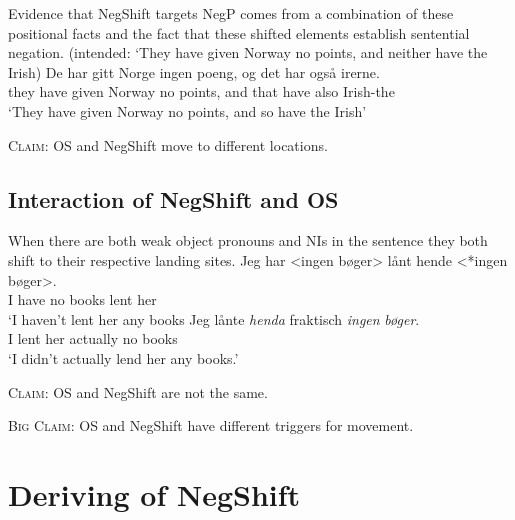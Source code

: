 \documentclass[12pt, letterpaper]{article}
\begin{document}
\ex Evidence that NegShift targets NegP comes from a combination of these positional facts and the fact that these shifted elements establish sentential negation.
	\glt (intended: ‘They have given Norway no points, and neither have the Irish) \label{ex:NEITHER}
	\ex 
	\gll De har gitt Norge ingen poeng, og det har også irerne.\\
	they have given Norway no points, and that have also Irish-the\\
	\glt `They have given Norway no points, and so have the Irish'
	\z 
\z

\begin{tcolorbox}[width=\linewidth]
\textsc{Claim}: OS and NegShift move to different locations.
\end{tcolorbox}

\subsection{Interaction of NegShift and OS} \label{sec:NEG-OS}
\ea When there are both weak object pronouns and NIs in the sentence they both shift to their respective landing sites. 
	\ea \label{ex:NegShift}
	\gll Jeg har <ingen bøger> lånt hende <*ingen bøger>.\\
	I have no books lent her\\
	\glt `I haven't lent her any books
	\ex \label{ex:NegOS}
	\gll Jeg lånte \textit{henda} fraktisch \textit{ingen} \textit{bøger}.\\
	I lent her actually no books\\
	\glt `I didn't actually lend her any books.'
	\z 

\z

\begin{tcolorbox}[width=\linewidth]
\textsc{Claim:} OS and NegShift are not the same.

\textsc{Big Claim:} OS and NegShift have different triggers for movement. 
\end{tcolorbox}


\section{Deriving of NegShift} \label{sec:ZEIJLSTRA}
\end{document}
